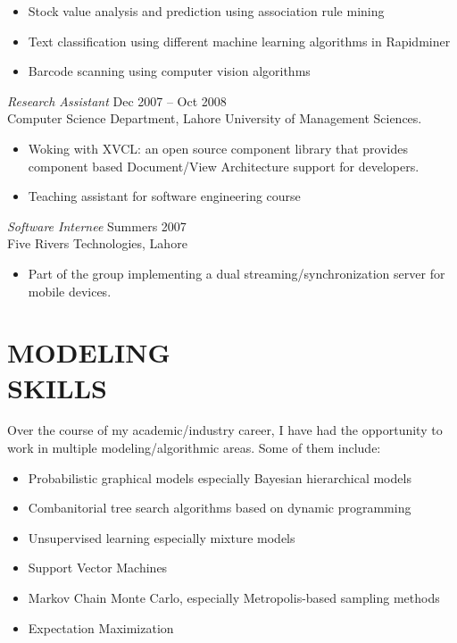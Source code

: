 \documentclass[margin, 10pt]{res} %
\begin{document}
\begin{resume}
\begin{itemize} \itemsep -2pt %
\item Stock value analysis and prediction using association rule mining
\item Text classification using different machine learning algorithms in Rapidminer 
\item Barcode scanning using computer vision algorithms
\end{itemize} 
 
{\sl Research Assistant} \hfill Dec 2007 – Oct 2008 \\
Computer Science Department, Lahore University of Management Sciences. 
\begin{itemize} 
\item Woking with XVCL: an open source component library that provides component based Document/View Architecture support for developers.
\item Teaching assistant for software engineering course
\end{itemize} 

{\sl Software Internee} \hfill Summers 2007 \\
Five Rivers Technologies, Lahore
\begin{itemize}
\item Part of the group implementing a dual streaming/synchronization server for mobile devices.
\end{itemize} 


\section{MODELING \\ SKILLS}

Over the course of my academic/industry career, I have had the opportunity to work in multiple modeling/algorithmic areas. Some of them include:  \\
\begin{itemize}
\item Probabilistic graphical models especially Bayesian hierarchical models
\item Combanitorial tree search algorithms based on dynamic programming
\item Unsupervised learning especially mixture models
\item Support Vector Machines 
\item Markov Chain Monte Carlo, especially Metropolis-based sampling methods
\item Expectation Maximization
\end{itemize} 


\end{resume}
\end{document}
